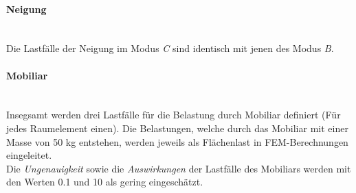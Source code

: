 \paragraph{Neigung}\mbox{}\\
Die Lastfälle der Neigung im Modus \emph{C} sind identisch mit jenen des Modus \emph{B}.

\paragraph{Mobiliar}\mbox{}\\
Insegsamt werden drei Lastfälle für die Belastung durch Mobiliar definiert (Für jedes Raumelement einen). Die Belastungen, welche durch das Mobiliar mit einer Masse von 50 kg entstehen, werden jeweils als Flächenlast in FEM-Berechnungen eingeleitet.\\
Die \emph{Ungenauigkeit} sowie die \emph{Auswirkungen} der Lastfälle des Mobiliars werden mit den Werten 0.1 und 10 als gering eingeschätzt.


